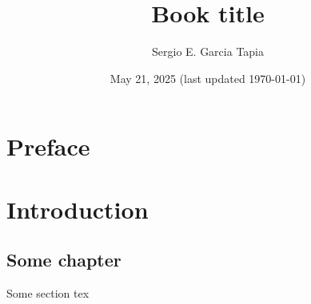 \documentclass[11pt]{book}
\title{Book title}
\author{Sergio E. Garcia Tapia}
\date{May 21, 2025 (last updated \today)}
\begin{document}
	\maketitle
	\tableofcontents
	
	\chapter*{Preface}
	\chapter{Introduction}
	\section{Some chapter}
	Some section tex
	
	
	\printindex
\end{document}
